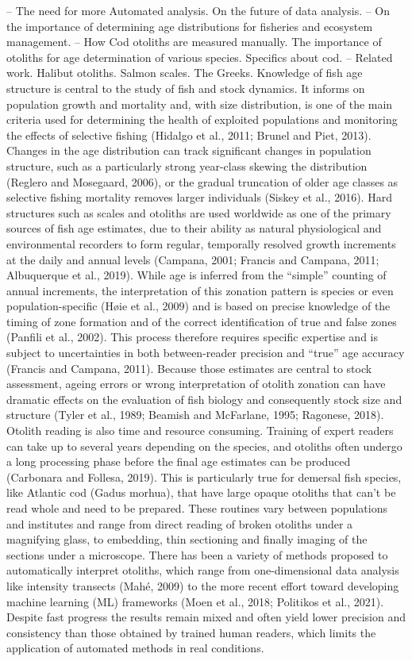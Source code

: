 \documentclass[10pt,letterpaper]{article}
\begin{document}
– The need for more Automated analysis. On the future of data analysis.
– On the importance of determining age distributions for fisheries and ecosystem management.
– How Cod otoliths are measured manually. The importance of otoliths for age determination of various species. Specifics about cod.
– Related work. Halibut otoliths. Salmon scales. The Greeks.
Knowledge of fish age structure is central to the study of fish and stock dynamics. It informs on population growth and mortality and, with size distribution, is one of the main criteria used for determining the health of exploited populations and monitoring the effects of selective fishing (Hidalgo et al., 2011; Brunel and Piet, 2013). Changes in the age distribution can track significant changes in population structure, such as a particularly strong year-class skewing the distribution (Reglero and Mosegaard, 2006), or the gradual truncation of older age classes as selective fishing mortality removes larger individuals (Siskey et al., 2016).
Hard structures such as scales and otoliths are used worldwide as one of the primary sources of fish age estimates, due to their ability as natural physiological and environmental recorders to form regular, temporally resolved growth increments at the daily and annual levels (Campana, 2001; Francis and Campana, 2011; Albuquerque et al., 2019). While age is inferred from the “simple” counting of annual increments, the interpretation of this zonation pattern is species or even population-specific (Høie et al., 2009) and is based on precise knowledge of the timing of zone formation and of the correct identification of true and false zones (Panfili et al., 2002). This process therefore requires specific expertise and is subject to uncertainties in both between-reader precision and “true” age accuracy (Francis and Campana, 2011). Because those estimates are central to stock assessment, ageing errors or wrong interpretation of otolith zonation can have dramatic effects on the evaluation of fish biology and consequently stock size and structure (Tyler et al., 1989; Beamish and McFarlane, 1995; Ragonese, 2018). 
Otolith reading is also time and resource consuming. Training of expert readers can take up to several years depending on the species, and otoliths often undergo a long processing phase before the final age estimates can be produced (Carbonara and Follesa, 2019). This is particularly true for demersal fish species, like Atlantic cod (Gadus morhua), that have large opaque otoliths that can’t be read whole and need to be prepared. These routines vary between populations and institutes and range from direct reading of broken otoliths under a magnifying glass, to embedding, thin sectioning and finally imaging of the sections under a microscope. There has been a variety of methods proposed to automatically interpret otoliths, which range from one-dimensional data analysis like intensity transects (Mahé, 2009) to the more recent effort toward developing machine learning (ML) frameworks (Moen et al., 2018; Politikos et al., 2021). Despite fast progress the results remain mixed and often yield lower precision and consistency than those obtained by trained human readers, which limits the application of automated methods in real conditions.
\end{document}
